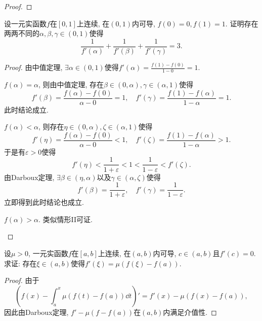 \begin{quiza}
\begin{proof}
\end{proof}
\woe 设一元实函数\(f\)在\([0,1]\)上连续, 在\((0,1)\)内可导, \(f(0)=0,f(1)=1\). 证明存在两两不同的\(\alpha,\beta,\gamma\in (0,1)\)使得\[\frac{1}{f'(\alpha)}+\frac{1}{f'(\beta)}+\frac{1}{f'(\gamma)}=3.\]
\begin{proof}
由中值定理, \(\exists \alpha\in(0,1)\)使得\(f'(\alpha)=\frac{f(1)-f(0)}{1-0}=1\).
\begin{asparaenum}[\textbf{情形}I]
\item \(f(\alpha)=\alpha\), 则由中值定理, 存在\(\beta\in(0,\alpha),\gamma\in(\alpha,1)\)使得\[f'(\beta)=\frac{f(\alpha)-f(0)}{\alpha-0}=1,\quad f'(\gamma)=\frac{f(1)-f(\alpha)}{1-\alpha}=1.\]此时结论成立.
\item \(f(\alpha)<\alpha\), 则存在\(\eta\in(0,\alpha),\zeta\in(\alpha,1)\)使得\[f'(\eta)=\frac{f(\alpha)-f(0)}{\alpha-0}<1,\quad f'(\zeta)=\frac{f(1)-f(\alpha)}{1-\alpha}>1.\]于是有\(\varepsilon>0\)使得\[f'(\eta)<\frac{1}{1+\varepsilon}<1<\frac{1}{1-\varepsilon}<f'(\zeta).\]由Darboux定理, \(\exists\beta\in(\eta,\alpha)\)以及\(\gamma\in(\alpha,\zeta)\)使得\[f'(\beta)=\frac{1}{1+\varepsilon},\quad f'(\gamma)=\frac{1}{1-\varepsilon}.\]立即得到此时结论也成立.
\item \(f(\alpha)>\alpha\). 类似情形II可证.\qedhere
\end{asparaenum}
\end{proof}
\woe 设\(\mu>0\), 一元实函数\(f\)在\([a,b]\)上连续, 在\((a,b)\)内可导, \(c\in(a,b)\)且\(f'(c)=0\). 求证: 存在\(\xi\in(a,b)\)使得\(f'(\xi)=\mu\left(f(\xi)-f(a)\right)\).
\begin{proof}
由于\[\left(f(x)-\int_{a}^{x}\mu\left(f(t)-f(a)\right)\dd t\right)'=f'(x)-\mu\left(f(x)-f(a)\right),\]因此由Darboux定理, \(f'-\mu\left(f-f(a)\right)\)在\((a,b)\)内满足介值性. 


\end{proof}
\end{quiza}
